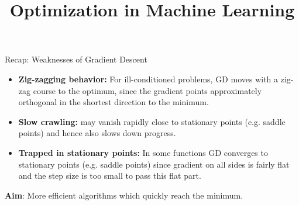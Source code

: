 \documentclass[11pt,compress,t,notes=noshow, xcolor=table]{beamer}
\title{Optimization in Machine Learning}
\date{}
\begin{document}
\sloppy
\begin{vbframe}{Recap: Weaknesses of Gradient Descent}
\begin{itemize}
\item \textbf{Zig-zagging behavior:} For ill-conditioned problems, GD moves with a zig-zag course to the optimum, since the gradient points approximately orthogonal in the shortest direction to the minimum.
\item \textbf{Slow crawling:} may vanish rapidly close to stationary points (e.g. saddle points) and hence also slows down progress.
\item \textbf{Trapped in stationary points:} In some functions GD converges to stationary points (e.g. saddle points) since gradient on all sides is fairly flat and the step size is too small to pass this flat part.
\end{itemize}

\lz 

\textbf{Aim}: More efficient algorithms which quickly reach the minimum.

\end{vbframe}

\end{document}
